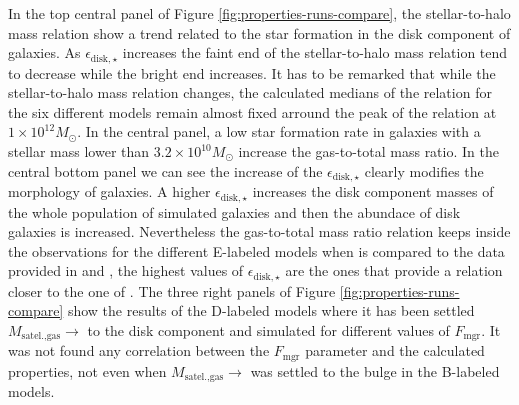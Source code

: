 \documentclass[usenatbib]{mn2e}
\begin{document}
In the top central panel of Figure \ref{fig:properties-runs-compare},
the stellar-to-halo mass relation show a trend related to the star
formation in the disk component of galaxies. As
$\epsilon_{\text{disk},\star}$  increases the faint end of the
stellar-to-halo mass relation tend to decrease while the bright end
increases. It has to be remarked that while the stellar-to-halo mass
relation changes, the calculated medians of the relation for the six
different models remain almost fixed arround the peak of the relation
at $1\times 10^{12}M_{\odot}$. In the central panel,  a low star
formation rate in galaxies with a stellar mass lower than $3.2\times
10^{10}M_{\odot}$ increase the gas-to-total mass ratio.  In the
central bottom panel we can see the increase of the
$\epsilon_{\text{disk},\star}$ clearly modifies the morphology of
galaxies. A higher  $\epsilon_{\text{disk},\star}$ increases the disk
component masses of the whole population of simulated galaxies and
then the abundace of disk galaxies is increased.  Nevertheless the
gas-to-total mass ratio relation keeps inside the observations for the
different E-labeled models when is compared to the data provided in
\cite{2003ApJS..149..289B} and \cite{2003ApJ...585L.117B}, the highest
values of $\epsilon_{\text{disk},\star}$ are the ones that provide a relation 
closer to the one of \cite{2010ApJ...710..903M}. The  three right
panels of Figure \ref{fig:properties-runs-compare} show the results of
the D-labeled models where it has been settled
$M_{\text{satel.,gas}}\to$ to the disk component and simulated for
different values of $F_{\text{mgr}}$. It was not found any correlation
between the $F_{\text{mgr}}$ parameter and the calculated properties,
not even when $M_{\text{satel.,gas}}\to$ was settled to the bulge in
the B-labeled models. 
\end{document}
